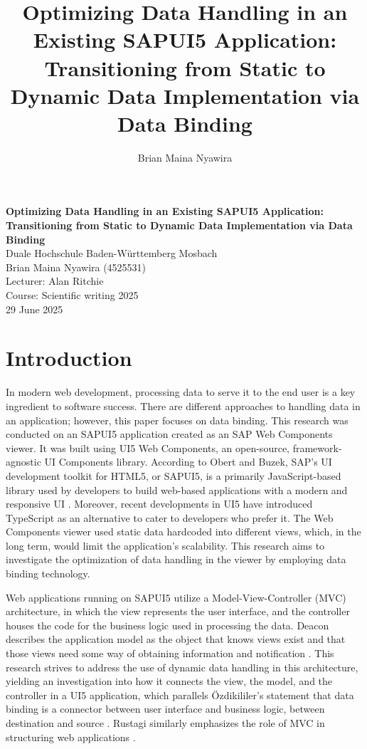 \documentclass{article}
\author{Brian Maina Nyawira}
\title{Optimizing Data Handling in an Existing SAPUI5 Application: Transitioning from Static to Dynamic Data Implementation via Data Binding}
\begin{document}
\begin{titlepage}
    \centering
    \vspace*{1cm}
    \huge{\textbf{Optimizing Data Handling in an Existing SAPUI5 Application: Transitioning from Static to Dynamic Data Implementation via Data Binding}} \\ %
    \vspace{1cm}
    \Large{Duale Hochschule Baden-W\"urttemberg Mosbach} \\
    \vspace{1cm}
    \Large{Brian Maina Nyawira (4525531)} \\
    \vspace{0.5cm}
    \normalsize{Lecturer: Alan Ritchie} \\
    \normalsize{Course: Scientific writing 2025} \\
    \vfill
    \normalsize{29 June 2025}
\end{titlepage}

\pagestyle{fancy}

\section{Introduction}
In modern web development, processing data to serve it to the end user is a key ingredient to software success. There are different approaches to handling data in an application; however, this paper focuses on data binding. This research was conducted on an SAPUI5 application created as an SAP Web Components viewer. It was built using UI5 Web Components, an open-source, framework-agnostic UI Components library. According to Obert and Buzek, SAP’s UI development toolkit for HTML5, or SAPUI5, is a primarily JavaScript-based library used by developers to build web-based applications with a modern and responsive UI \parencite{Obert2023}. Moreover, recent developments in UI5 have introduced TypeScript as an alternative to cater to developers who prefer it. The Web Components viewer used static data hardcoded into different views, which, in the long term, would limit the application’s scalability. This research aims to investigate the optimization of data handling in the viewer by employing data binding technology.

Web applications running on SAPUI5 utilize a Model-View-Controller (MVC) architecture, in which the view represents the user interface, and the controller houses the code for the business logic used in processing the data. Deacon describes the application model as the object that knows views exist and that those views need some way of obtaining information and notification \parencite{Deacon2013}. This research strives to address the use of dynamic data handling in this architecture, yielding an investigation into how it connects the view, the model, and the controller in a UI5 application, which parallels Özdikililer’s statement that data binding is a connector between user interface and business logic, between destination and source \parencite{Ozdikililer2021}. Rustagi similarly emphasizes the role of MVC in structuring web applications \parencite{Rustagi2023}.
\end{document}
